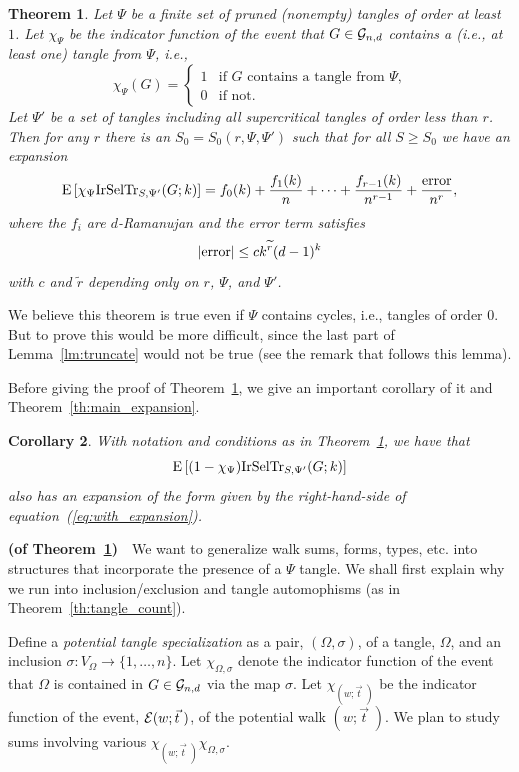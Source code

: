 \documentclass[12pt]{article}
\newtheorem{theorem}{Theorem}[section]
\newtheorem{corollary}[theorem]{Corollary}
\newcommand{\dtreelike}{{$d$-Ramanujan}}
\newcommand{\from}{\colon}
\newcommand{\cg}{{\cal G}}
\newcommand{\cgnd}{\cg_{n,d}}
\newcommand{\tset}{{\Psi}}
\newcommand{\irdsel}{{\rm IrSelTr}}
\newcommand{\intn}{{\{1,\ldots,n\}}}
\newcommand{\E}[1]{\mbox{E}\left[#1\right] }
\newcommand{\proof}{{\par\noindent {\bf Proof}\space\space}}
\begin{document}
\begin{theorem}\label{th:with}
Let $\tset$ be a finite set of pruned (nonempty)
tangles of order at least $1$.  Let $\chi_\tset$ be the
indicator function of the event that $G\in\cgnd$ contains a (i.e., at 
least one) tangle
from $\tset$, i.e.,
$$
\chi_\tset(G)=\left\{ \begin{array}{ll} 1 & \mbox{if $G$ contains a tangle
from $\tset$,} \\ 0 & \mbox{if not.}\end{array} \right. 
$$
Let $\tset'$ be a set of tangles including all
supercritical tangles of order less than $r$.  
Then for any $r$ there is an $S_0=S_0(r,\tset,\tset')$ such
that for all $S\ge S_0$ we have an expansion
\begin{equation}\label{eq:with_expansion}
\E{\chi_\tset\irdsel_{S,\tset'}(G;k)} = f_0(k)+\frac{  f_1(k)}{n}+\cdots+
\frac{  f_{r-1}(k)}{n^{r-1}}+\frac{{\rm error}}{n^r},
\end{equation}
where 
the $f_i$ are {\dtreelike} and the error term satisfies 
$$
|{\rm error}| \le c k^{\widetilde r}(d-1)^k
$$
with $c$ and $\widetilde r$ depending only on $r$, $\tset$, and $\tset'$.
\end{theorem}

We believe this theorem is true even if $\tset$ contains cycles, i.e.,
tangles of order $0$.  But to prove this would be more difficult,
since the last part of Lemma~\ref{lm:truncate} would not be true
(see the remark that follows this lemma).  

Before giving the proof of Theorem~\ref{th:with}, we give an important
corollary of it and Theorem~\ref{th:main_expansion}.
\begin{corollary} With notation and conditions
as in Theorem~\ref{th:with}, we have
that
$$
\E{(1-\chi_\tset)\irdsel_{S,\tset'}(G;k)}
$$
also has an expansion of the form given by the right-hand-side of
equation~(\ref{eq:with_expansion}).
\end{corollary}

\proof {\bf (of Theorem~\ref{th:with})}\ \ 
We want to generalize walk sums, forms, types, etc. into structures
that incorporate the presence of a $\tset$ tangle.  We shall first
explain why we run into inclusion/exclusion and tangle automophisms
(as in Theorem~\ref{th:tangle_count}).

Define a
{\em potential tangle specialization} as a pair, $(\Omega,\sigma)$,
of a tangle, $\Omega$, and an inclusion $\sigma\from V_\Omega\to\intn$.
Let $\chi_{\Omega,\sigma}$ denote the indicator function of the event
that $\Omega$ is contained in $G\in\cgnd$ via the map $\sigma$.
Let $\chi_{(w;\vec t\;)}$ be the indicator function of the event,
${\cal E}(w;\vec t\;)$, of the
potential
walk $(w;\vec t\;)$.
We plan to study sums involving various 
$\chi_{(w;\vec t\;)}\chi_{\Omega,\sigma}$.
\end{document}
